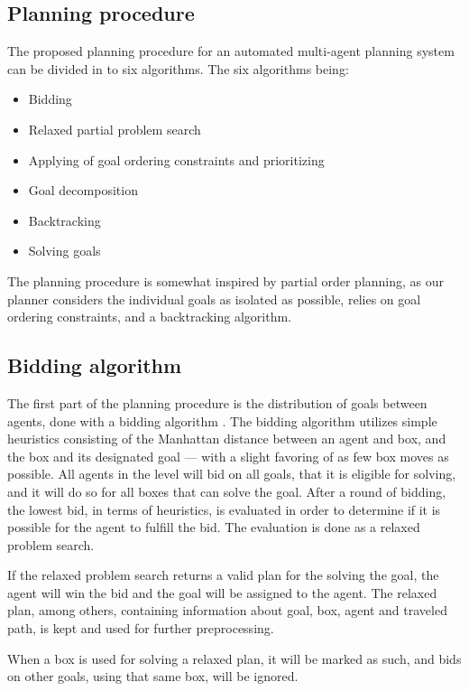 \documentclass[Main]{subfiles}
\begin{document}
\subsection{Planning procedure}
The proposed planning procedure for an automated multi-agent planning system can
be divided in to six algorithms. The six algorithms being:

\begin{itemize}
\item Bidding
\item Relaxed partial problem search
\item Applying of goal ordering constraints and prioritizing
\item Goal decomposition
\item Backtracking
\item Solving goals
\end{itemize}

The planning procedure is somewhat inspired by partial order planning, as our
planner considers the individual goals as isolated as possible, relies on goal
ordering constraints, and a backtracking algorithm. 



\subsection{Bidding algorithm}
The first part of the planning procedure is the distribution of goals between
agents, done with a bidding algorithm \citep{VanderKrogt2005}. The bidding
algorithm utilizes simple heuristics consisting of the Manhattan distance
between an agent and box, and the box and its designated goal --- with a slight
favoring of as few box moves as possible. All agents in the level will bid on
all goals, that it is eligible for solving, and it will do so for all boxes that
can solve the goal. After a round of bidding, the lowest bid, in terms of
heuristics, is evaluated in order to determine if it is possible for the agent
to fulfill the bid. The evaluation is done as a relaxed problem search. 


If the relaxed problem search returns a valid plan for the solving the goal, the
agent will win the bid and the goal will be assigned to the agent. The relaxed
plan, among others, containing information about goal, box, agent and traveled
path, is kept and used for further preprocessing. 

When a box is used for solving a relaxed plan, it will be marked as such, and
bids on other goals, using that same box, will be ignored. 
\end{document}
